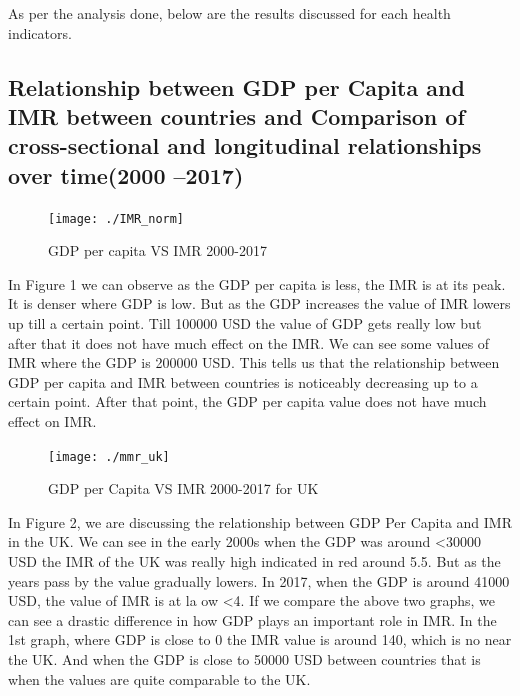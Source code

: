 \documentclass[
]{article}
\begin{document}
As per the analysis done, below are the results discussed for each
health indicators.

\hypertarget{relationship-between-gdp-per-capita-and-imr-between-countries-and-comparison-of-cross-sectional-and-longitudinal-relationships-over-time2000-2017}{%
\subsection{Relationship between GDP per Capita and IMR between
countries and Comparison of cross-sectional and longitudinal
relationships over time(2000
--2017)}\label{relationship-between-gdp-per-capita-and-imr-between-countries-and-comparison-of-cross-sectional-and-longitudinal-relationships-over-time2000-2017}}

\begin{figure}[H]

{\centering \texttt{[image: ./IMR\_norm]} 

}

\caption{GDP per capita VS IMR 2000-2017}\label{fig:plot1}
\end{figure}

In Figure 1 we can observe as the GDP per capita is less, the IMR is at
its peak. It is denser where GDP is low. But as the GDP increases the
value of IMR lowers up till a certain point. Till 100000 USD the value
of GDP gets really low but after that it does not have much effect on
the IMR. We can see some values of IMR where the GDP is 200000 USD. This
tells us that the relationship between GDP per capita and IMR between
countries is noticeably decreasing up to a certain point. After that
point, the GDP per capita value does not have much effect on IMR.

\begin{figure}[H]

{\centering \texttt{[image: ./mmr\_uk]} 

}

\caption{GDP per Capita VS IMR 2000-2017 for UK}\label{fig:plot2}
\end{figure}

In Figure 2, we are discussing the relationship between GDP Per Capita
and IMR in the UK. We can see in the early 2000s when the GDP was around
\textless30000 USD the IMR of the UK was really high indicated in red
around 5.5. But as the years pass by the value gradually lowers. In
2017, when the GDP is around 41000 USD, the value of IMR is at la ow
\textless4. If we compare the above two graphs, we can see a drastic
difference in how GDP plays an important role in IMR. In the 1st graph,
where GDP is close to 0 the IMR value is around 140, which is no near
the UK. And when the GDP is close to 50000 USD between countries that is
when the values are quite comparable to the UK.
\end{document}
